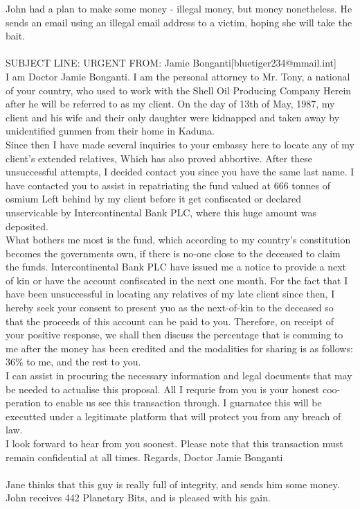 \documentclass{article}
\begin{document}
John had a plan to make some money {-} illegal money, but money nonetheless.
He sends an email using an illegal email address to a victim, hoping she will take the bait.
\\\\
SUBJECT LINE: URGENT
FROM: Jamie Bonganti[bluetiger234@mmail.int]
\\
I am Doctor Jamie Bonganti.
I am the personal attorney to Mr. Tony, a national of your country, who used to work with the Shell Oil Producing Company
Herein after he will be referred to as my client.
On the day of 13th of May, 1987, my client and his wife and their only daughter were kidnapped and taken away by unidentified gunmen from their home in Kaduna.
\\
Since then I have made several inquiries to your embassy here to locate any of my client's extended relatives, Which has also proved abbortive.
After these unsuccessful attempts, I decided contact you since you have the same last name.
I have contacted you to assist in repatriating the fund valued at 666 tonnes of osmium Left behind by my client before it get confiscated or declared unservicable by Intercontinental Bank PLC, where this huge amount was deposited.
\\
What bothers me most is the fund, which according to my country's constitution becomes the governments own, if there is no{-}one close to the deceased to claim the funds.
Intercontinental Bank PLC have issued me a notice to provide a next of kin or have the account confiscated in the next one month.
For the fact that I have been unsuccessful in locating any relatives of my late client since then, I hereby seek your consent to present yuo as the next{-}of{-}kin to the deceased so that the proceeds of this account can be paid to you.
Therefore, on receipt of your positive response, we shall then discuss the percentage that is comming to me after the money has been credited and the modalities for sharing is as follows: 36\% to me, and the rest to you.
\\
I can assist in procuring the necessary information and legal documents that may be needed to actualise this proposal.
All I requrie from you is your honest coo{-}peration to enable us see this transaction through.
I guarnatee this will be executted under a legitimate platform that will protect you from any breach of law.
\\
I look forward to hear from you soonest.
Please note that this transaction must remain confidential at all times.
Regards, Doctor Jamie Bonganti
\\\\
Jane thinks that this guy is really full of integrity, and sends him some money.
John receives 442 Planetary Bits, and is pleased with his gain.
\end{document}

